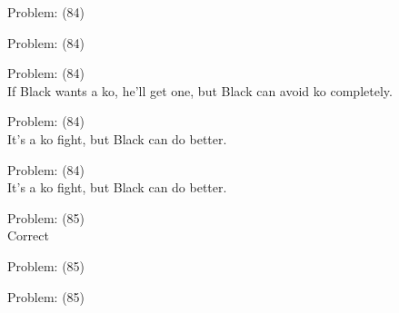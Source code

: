 \documentclass[11pt]{article}
\begin{document}
\begin{minipage}[t]{0.5\textwidth}
  {\centering
  
Problem: (84)\\
  }
\end{minipage}
\begin{minipage}[t]{0.5\textwidth}
  {\centering
  
Problem: (84)\\
  }
\end{minipage}
\begin{minipage}[t]{0.5\textwidth}
  {\centering
  
Problem: (84)\\
If Black wants a ko, he'll get one, but Black can avoid ko completely.\\
  }
\end{minipage}
\begin{minipage}[t]{0.5\textwidth}
  {\centering
  
Problem: (84)\\
It's a ko fight, but Black can do better.\\
  }
\end{minipage}
\begin{minipage}[t]{0.5\textwidth}
  {\centering
  
Problem: (84)\\
It's a ko fight, but Black can do better.\\
  }
\end{minipage}
\begin{minipage}[t]{0.5\textwidth}
  {\centering
  
Problem: (85)\\
Correct\\
  }
\end{minipage}
\begin{minipage}[t]{0.5\textwidth}
  {\centering
  
Problem: (85)\\
  }
\end{minipage}
\begin{minipage}[t]{0.5\textwidth}
  {\centering
  
Problem: (85)\\
  }
\end{minipage}
\end{document}
